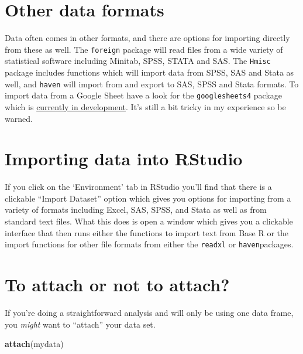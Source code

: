\documentclass[
]{book}
\newenvironment{Shaded}{\begin{snugshade}}{\end{snugshade}}
\newcommand{\KeywordTok}[1]{\textcolor[rgb]{0.13,0.29,0.53}{\textbf{#1}}}
\newcommand{\NormalTok}[1]{#1}
\begin{document}
\hypertarget{other-data-formats}{%
\section{Other data formats}\label{other-data-formats}}

Data often comes in other formats, and there are options for importing directly from these as well. The \texttt{foreign} package will read files from a wide variety of statistical software including Minitab, SPSS, STATA and SAS. The \texttt{Hmisc} package includes functions which will import data from SPSS, SAS and Stata as well, and \texttt{haven} will import from and export to SAS, SPSS and Stata formats. To import data from a Google Sheet have a look for the \texttt{googlesheets4} package which is \href{https://googlesheets4.tidyverse.org/}{currently in development}. It's still a bit tricky in my experience so be warned.

\hypertarget{importing-data-into-rstudio}{%
\section{Importing data into RStudio}\label{importing-data-into-rstudio}}

If you click on the `Environment' tab in RStudio you'll find that there is a clickable ``Import Dataset'' option which gives you options for importing from a variety of formats including Excel, SAS, SPSS, and Stata as well as from standard text files. What this does is open a window which gives you a clickable interface that then runs either the functions to import text from Base R or the import functions for other file formats from either the \texttt{readxl} or \texttt{haven}packages.

\hypertarget{to-attach-or-not-to-attach}{%
\section{To attach or not to attach?}\label{to-attach-or-not-to-attach}}

If you're doing a straightforward analysis and will only be using one data frame, you \emph{might} want to ``attach'' your data set.

\begin{Shaded}
\begin{Highlighting}[]
\KeywordTok{attach}\NormalTok{(mydata)}
\end{Highlighting}
\end{Shaded}
\end{document}
